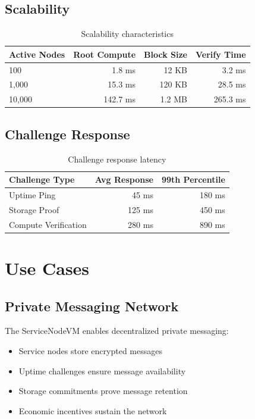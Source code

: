 \documentclass[11pt,a4paper]{article}
\begin{document}
\subsection{Scalability}

\begin{table}[h]
\centering
\begin{tabular}{lrrr}
\toprule
\textbf{Active Nodes} & \textbf{Root Compute} & \textbf{Block Size} & \textbf{Verify Time} \\
\midrule
100 & 1.8 ms & 12 KB & 3.2 ms \\
1,000 & 15.3 ms & 120 KB & 28.5 ms \\
10,000 & 142.7 ms & 1.2 MB & 265.3 ms \\
\bottomrule
\end{tabular}
\caption{Scalability characteristics}
\end{table}

\subsection{Challenge Response}

\begin{table}[h]
\centering
\begin{tabular}{lrr}
\toprule
\textbf{Challenge Type} & \textbf{Avg Response} & \textbf{99th Percentile} \\
\midrule
Uptime Ping & 45 ms & 180 ms \\
Storage Proof & 125 ms & 450 ms \\
Compute Verification & 280 ms & 890 ms \\
\bottomrule
\end{tabular}
\caption{Challenge response latency}
\end{table}

\section{Use Cases}

\subsection{Private Messaging Network}

The ServiceNodeVM enables decentralized private messaging:
\begin{itemize}
    \item Service nodes store encrypted messages
    \item Uptime challenges ensure message availability
    \item Storage commitments prove message retention
    \item Economic incentives sustain the network
\end{itemize}
\end{document}
